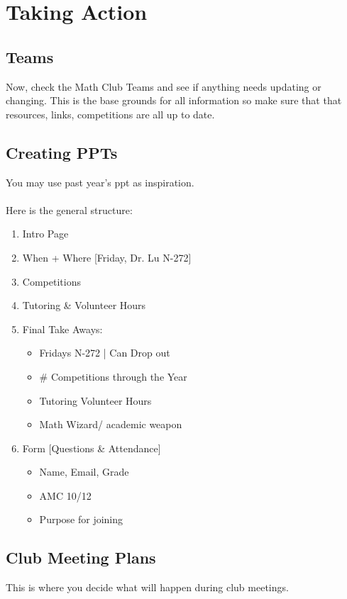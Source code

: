\chapter{Taking Action}

\section{Teams}
Now, check the Math Club Teams and see if anything needs updating or changing.
This is the base grounds for all information so make sure that 
that resources, links, competitions are all up to date.

\section{Creating PPTs}
You may use past year's ppt as inspiration. \\\\ Here is the general structure:

\begin{enumerate}
    \item Intro Page
    \item When + Where [Friday, Dr. Lu N-272] 
    \item Competitions  
    \item Tutoring \& Volunteer Hours 
    \item Final Take Aways: 
            \begin{itemize}
                \item Fridays N-272  | Can Drop out 
                \item  \# Competitions through the Year 
                \item  Tutoring Volunteer Hours 
                \item  Math Wizard/ academic weapon    
            \end{itemize}
    \item Form [Questions \& Attendance] 
            \begin{itemize}
                \item Name, Email, Grade
                \item AMC 10/12 
                \item Purpose for joining
            \end{itemize}

\end{enumerate}

\section{Club Meeting Plans}
This is where you decide what will happen during club meetings.

